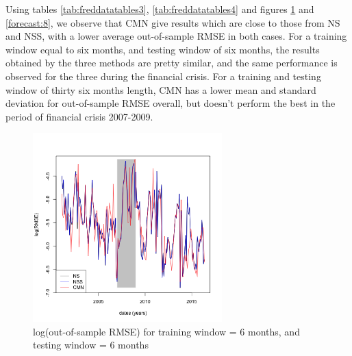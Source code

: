Using tables \ref{tab:freddatatables3}, \ref{tab:freddatatables4} and figures \ref{forecast:7} and \ref{forecast:8}, we observe that CMN give results which are close to those from NS and NSS, with a lower average out-of-sample RMSE in both cases. For a training window equal to six months, and testing window of six months, the results obtained by the three methods are pretty similar, and the same performance is observed for the three during the financial crisis.  For a training and testing window of thirty six months length, CMN has a lower mean and standard deviation for out-of-sample RMSE overall, but doesn't perform the best in the period of financial crisis 2007-2009. 


\begin{figure}[!htb]
\centering
  \includegraphics[width=0.65\textwidth]{gfx/chapter-yc-insurance/forecasting_graph7}
\caption{log(out-of-sample RMSE) for training window = 6 months, and testing window = 6 months}
\label{forecast:7}       %
\end{figure}

